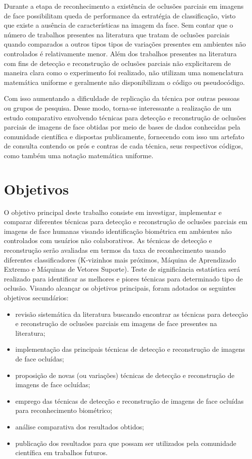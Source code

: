 Durante a etapa de reconhecimento a existência de oclusões parciais em imagens de face possibilitam queda de performance da estratégia de classificação, visto que existe a ausência de características na imagem da face. Sem contar que o número de trabalhos presentes na literatura que tratam de oclusões parciais quando comparados a outros tipos tipos de variações presentes em ambientes não controlados é relativamente menor. Além dos trabalhos presentes na literatura com fins de detecção e reconstrução de oclusões parciais não explicitarem de maneira clara como o experimento foi realizado, não utilizam uma nomenclatura matemática uniforme e geralmente não disponibilizam o código ou pseudocódigo.

Com isso aumentando a dificuldade de replicação da técnica por outras pessoas ou grupos de pesquisa. Desse modo, torna-se interessante a realização de um estudo comparativo envolvendo técnicas para detecção e reconstrução de oclusões parciais de imagens de face obtidas por meio de bases de dados conhecidas pela comunidade científica e dispostas publicamente, fornecendo com isso um artefato de consulta contendo os prós e contras de cada técnica, seus respectivos códigos, como  também uma notação matemática uniforme.



\section{Objetivos}

O objetivo principal deste trabalho consiste em investigar, implementar e comparar diferentes técnicas para detecção e reconstrução de oclusões parciais em imagens de face humanas visando identificação biométrica em ambientes não controlados com usuários não colaborativos. As técnicas de detecção e reconstrução serão avaliadas em termos da taxa de reconhecimento usando diferentes classificadores (K-vizinhos mais próximos, Máquina de Aprendizado Extremo e Máquinas de Vetores Suporte). Teste de significância estatística será realizado para identificar as melhores e piores técnicas para determinado tipo de oclusão. 
Visando alcançar os objetivos principais, foram adotados os seguintes objetivos secundários:

\begin{itemize}
\item revisão sistemática da literatura buscando encontrar as técnicas para detecção e reconstrução de oclusões parciais em imagens de face presentes na literatura;
\item implementação das principais técnicas de detecção e reconstrução de imagens de face ocluídas;
\item proposição de novas (ou variações) técnicas de detecção e reconstrução de imagens de face ocluídas;
\item emprego das técnicas de detecção e reconstrução de imagens de face ocluídas para reconhecimento biométrico;
\item análise comparativa dos resultados obtidos;
\item publicação dos resultados para que possam ser utilizados pela comunidade científica em trabalhos futuros.
\end{itemize}



